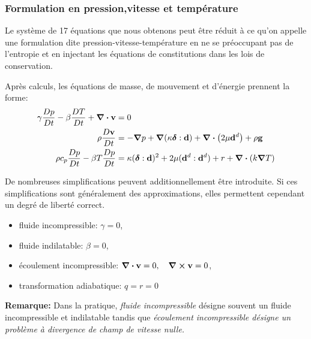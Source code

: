       \subsubsection{Formulation en pression,vitesse et température} \label{pvt}
        Le système de 17 équations que nous obtenons peut être réduit à ce qu'on appelle une formulation dite pression-vitesse-température en ne se préoccupant pas de l'entropie et en injectant les équations de constitutions dans les lois de conservation.

        Après calculs, les équations de masse, de mouvement et d'énergie prennent la forme:
        \begin{equation}
          \begin{aligned}
            \gamma\frac{D p}{D t} - \beta\frac{D T}{D t} + \div \vb{v} &= 0 \\
            \rho\frac{D \vb{v}}{D t} &= - \grad p + \grad (\kappa \boldsymbol{\delta} : \vb{d}) + \div (2\mu \vb{d}^d) + \rho \vb{g}\\
            \rho c_p \frac{D p}{D t} - \beta T \frac{D p}{D t} &= \kappa (\boldsymbol{\delta}:\vb{d})^2 + 2 \mu (\vb{d}^d : \vb{d}^d) + r + \div (k \grad T)
          \end{aligned}
        \end{equation}

        De nombreuses simplifications peuvent additionnellement être introduite. Si ces simplifications sont généralement des approximations, elles permettent cependant un degré de liberté correct.
        \begin{itemize}
          \item fluide incompressible: $\gamma = 0$,
          \item fluide indilatable: $\beta = 0$,
          \item écoulement incompressible: $\div \vb{v} = 0, \quad \curl \vb{v} = 0$,
          \item transformation adiabatique: $q = r = 0$
        \end{itemize}

        {\footnotesize \textbf{Remarque:} Dans la pratique, \textit{fluide incompressible} désigne souvent un fluide incompressible et indilatable tandis que \textit{écoulement incompressible désigne un problème à divergence de champ de vitesse nulle.}}

